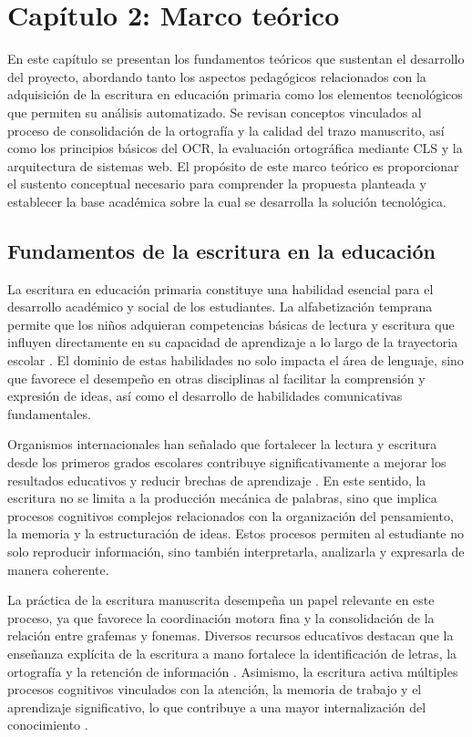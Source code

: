 \section{Capítulo 2: Marco teórico}

En este capítulo se presentan los fundamentos teóricos que sustentan el desarrollo del proyecto, abordando tanto los aspectos pedagógicos relacionados con la adquisición de la escritura en educación primaria como los elementos tecnológicos que permiten su análisis automatizado. Se revisan conceptos vinculados al proceso de consolidación de la ortografía y la calidad del trazo manuscrito, así como los principios básicos del OCR, la evaluación ortográfica mediante CLS y la arquitectura de sistemas web. El propósito de este marco teórico es proporcionar el sustento conceptual necesario para comprender la propuesta planteada y establecer la base académica sobre la cual se desarrolla la solución tecnológica.

\subsection{Fundamentos de la escritura en la educación}

La escritura en educación primaria constituye una habilidad esencial para el desarrollo académico y social de los estudiantes. La alfabetización temprana permite que los niños adquieran competencias básicas de lectura y escritura que influyen directamente en su capacidad de aprendizaje a lo largo de la trayectoria escolar \cite{unesco2024aprendizajes}. El dominio de estas habilidades no solo impacta el área de lenguaje, sino que favorece el desempeño en otras disciplinas al facilitar la comprensión y expresión de ideas, así como el desarrollo de habilidades comunicativas fundamentales.

Organismos internacionales han señalado que fortalecer la lectura y escritura desde los primeros grados escolares contribuye significativamente a mejorar los resultados educativos y reducir brechas de aprendizaje \cite{unesco2024alfabetizacion}. En este sentido, la escritura no se limita a la producción mecánica de palabras, sino que implica procesos cognitivos complejos relacionados con la organización del pensamiento, la memoria y la estructuración de ideas. Estos procesos permiten al estudiante no solo reproducir información, sino también interpretarla, analizarla y expresarla de manera coherente.

La práctica de la escritura manuscrita desempeña un papel relevante en este proceso, ya que favorece la coordinación motora fina y la consolidación de la relación entre grafemas y fonemas. Diversos recursos educativos destacan que la enseñanza explícita de la escritura a mano fortalece la identificación de letras, la ortografía y la retención de información \cite{readingrockets2024importance}. Asimismo, la escritura activa múltiples procesos cognitivos vinculados con la atención, la memoria de trabajo y el aprendizaje significativo, lo que contribuye a una mayor internalización del conocimiento \cite{edutopia2024teaching}.

